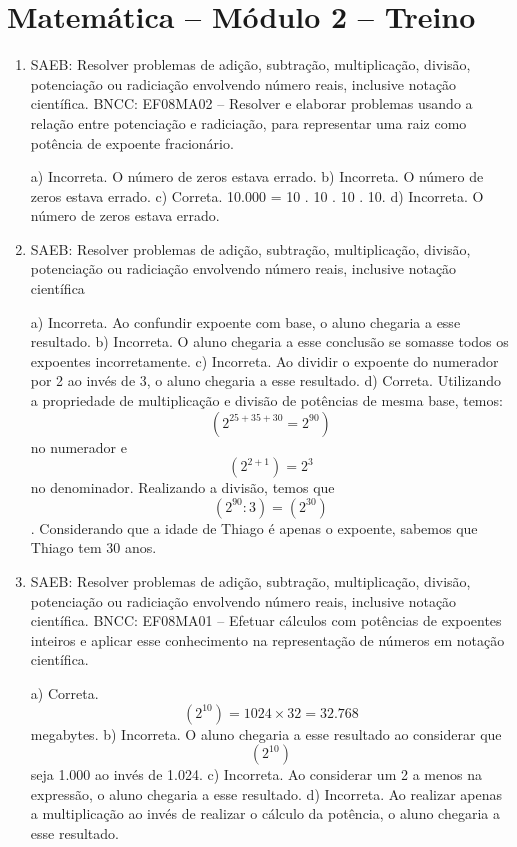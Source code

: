 \section*{Matemática – Módulo 2 – Treino}

\begin{enumerate}
\item SAEB: Resolver problemas de adição, subtração, multiplicação, divisão,
potenciação ou radiciação envolvendo número reais, inclusive notação
científica.
BNCC: EF08MA02 -- Resolver e elaborar problemas usando a relação entre
potenciação e radiciação, para representar uma raiz como potência de
expoente fracionário.

a) Incorreta. O número de zeros estava errado.
b) Incorreta. O número de zeros estava errado.
c) Correta. 10.000 = 10 . 10 . 10 . 10.
d) Incorreta. O número de zeros estava errado.

\item SAEB: Resolver problemas de adição, subtração, multiplicação, divisão,
potenciação ou radiciação envolvendo número reais, inclusive notação
científica

a) Incorreta. Ao confundir expoente com base, o aluno chegaria a
esse resultado.
b) Incorreta. O aluno chegaria a esse conclusão se somasse todos os
expoentes incorretamente.
c) Incorreta. Ao dividir o expoente do numerador por 2 ao invés de
3, o aluno chegaria a esse resultado.
d) Correta. Utilizando a propriedade de multiplicação e divisão de
potências de mesma base, temos: $$(2^{25+35+30}=2^{90})$$ no numerador
e $$(2^{2+1}) = 2^3$$ no denominador.
Realizando a divisão, temos que $$(2^{90}:3) = (2^{30})$$.
Considerando que a idade de Thiago é apenas o expoente, sabemos que
Thiago tem 30 anos.

\item SAEB: Resolver problemas de adição, subtração, multiplicação, divisão,
potenciação ou radiciação envolvendo número reais, inclusive notação
científica.
BNCC: EF08MA01 -- Efetuar cálculos com potências de expoentes inteiros e
aplicar esse conhecimento na representação de números em notação
científica.

a) Correta. $$(2^10) = 1024 \times 32 = 32.768$$ megabytes.
b) Incorreta. O aluno chegaria a esse resultado ao considerar que
$$(2^{10})$$ seja 1.000 ao invés de 1.024.
c) Incorreta. Ao considerar um 2 a menos na expressão, o aluno
chegaria a esse resultado.
d) Incorreta. Ao realizar apenas a multiplicação ao invés de
realizar o cálculo da potência, o aluno chegaria a esse resultado.


\end{enumerate}

